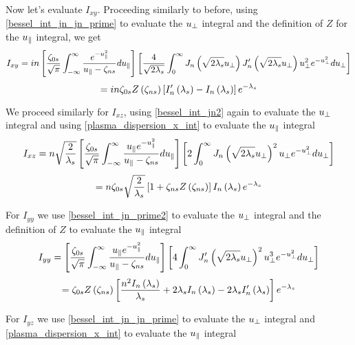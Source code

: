 Now let's evaluate $I_{xy}$. Proceeding similarly to before, using \eqref{bessel_int_jn_jn_prime} to evaluate the $u_\perp$ integral and the definition of $Z$ for the $u_\parallel$ integral, we get
\begin{equation*}
	I_{xy} = i n \left[ \frac{\zeta_{0s}}{\sqrt{\pi}} \int_{-\infty}^\infty \frac{e^{-u_\parallel^2}}{u_\parallel - \zeta_{ns}} du_\parallel \right] \left[ \frac{4}{\sqrt{2 \lambda_s}} \int_0^\infty J_n \left( \sqrt{2 \lambda_s} u_\perp \right) J_n' \left( \sqrt{2 \lambda_s} u_\perp \right) u_\perp^2 e^{-u_\perp^2} d u_\perp \right]
\end{equation*}
\begin{equation}
	= in \zeta_{0s} Z \left( \zeta_{ns} \right) \left[ I_n' \left( \lambda_s \right) - I_n \left( \lambda_s \right) \right] e^{-\lambda_s}
\end{equation}

We proceed similarly for $I_{xz}$, using \eqref{bessel_int_jn2} again to evaluate the $u_\perp$ integral and using \eqref{plasma_dispersion_x_int} to evaluate the $u_\parallel$ integral
\begin{equation*}
	I_{xz} = n \sqrt{\frac{2}{\lambda_s}} \left[ \frac{\zeta_{0s}}{\sqrt{\pi}} \int_{-\infty}^\infty \frac{u_\parallel e^{-u_\parallel^2}}{u_\parallel - \zeta_{ns}} du_\parallel \right] \left[ 2 \int_0^\infty J_n \left( \sqrt{2 \lambda_s} u_\perp \right)^2 u_\perp e^{-u_\perp^2} du_\perp \right]
\end{equation*}
\begin{equation}
	= n \zeta_{0s} \sqrt{\frac{2}{\lambda_s}} \left[ 1 + \zeta_{ns} Z \left( \zeta_{ns} \right) \right] I_n \left( \lambda_s \right) e^{-\lambda_s}
\end{equation}

For $I_{yy}$ we use \eqref{bessel_int_jn_prime2} to evaluate the $u_\perp$ integral and the definition of $Z$ to evaluate the $u_\parallel$ integral
\begin{equation*}
	I_{yy} = \left[ \frac{\zeta_{0s}}{\sqrt{\pi}} \int_{-\infty}^\infty \frac{u_\parallel e^{-u_\parallel^2}}{u_\parallel - \zeta_{ns}} du_\parallel \right] \left[ 4 \int_0^\infty J_n' \left( \sqrt{2 \lambda_s} u_\perp \right)^2 u_\perp^3 e^{-u_\perp^2} du_\perp \right]
\end{equation*}
\begin{equation}
	= \zeta_{0s} Z \left( \zeta_{ns} \right) \left[ \frac{n^2 I_n \left( \lambda_s \right)}{\lambda_s} + 2\lambda_s I_n \left( \lambda_s \right) - 2\lambda_s I_n' \left( \lambda_s \right) \right] e^{-\lambda_s}
\end{equation}

For $I_{yz}$ we use \eqref{bessel_int_jn_jn_prime} to evaluate the $u_\perp$ integral and \eqref{plasma_dispersion_x_int} to evaluate the $u_\parallel$ integral

